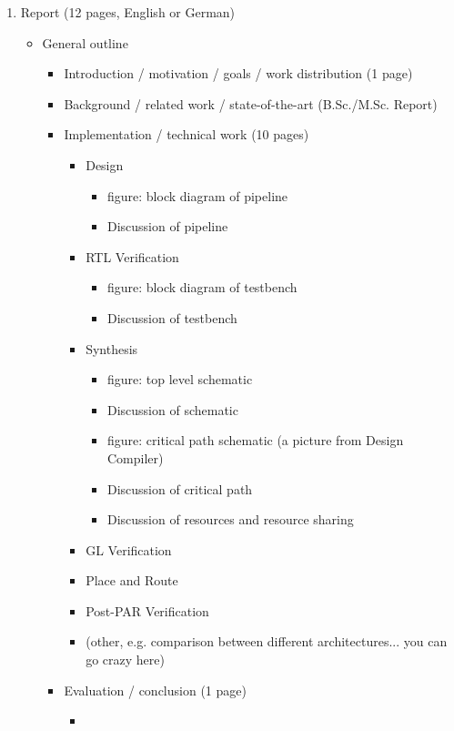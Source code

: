 \begin{enumerate}
	\item Report (12 pages, English or German)
		\begin{itemize}
		\item General outline
			\begin{itemize}		 
			\item Introduction / motivation / goals / work distribution (1 page)
			\item Background / related work / state-of-the-art (B.Sc./M.Sc. Report)
			\item Implementation / technical work (10 pages)
				\begin{itemize}
				\item Design
					\begin{itemize}
					\item figure: block diagram of pipeline
					\item Discussion of pipeline
					\end{itemize}					
				\item RTL Verification
					\begin{itemize}
					\item figure: block diagram of testbench
					\item Discussion of testbench
					\end{itemize}		
				\item Synthesis
					\begin{itemize}
					\item figure: top level schematic
					\item Discussion of schematic
					\item figure: critical path schematic (a picture from Design Compiler)
					\item Discussion of critical path 
					\item Discussion of resources and resource sharing
					\end{itemize}				
				\item GL Verification
				\item Place and Route
				\item Post-PAR Verification				
				\item (other, e.g. comparison between different architectures... you can go crazy here)
				\end{itemize}		 
			\item Evaluation / conclusion (1 page)
				\begin{itemize}
				\item 
				\end{itemize}

\end{itemize}
\end{itemize}
\end{enumerate}
